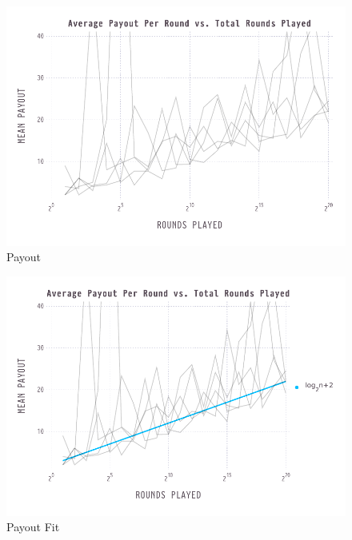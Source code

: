 \documentclass{article}
\begin{document}
\begin{figure}[htb]
  \centering
  \includegraphics[width=\textwidth]{average-over-time}
  \caption{Payout}
\end{figure}

\begin{figure}[htb]
  \centering
  \includegraphics[width=\textwidth]{average-over-time-fit}
  \caption{Payout Fit}
\end{figure}
\end{document}
